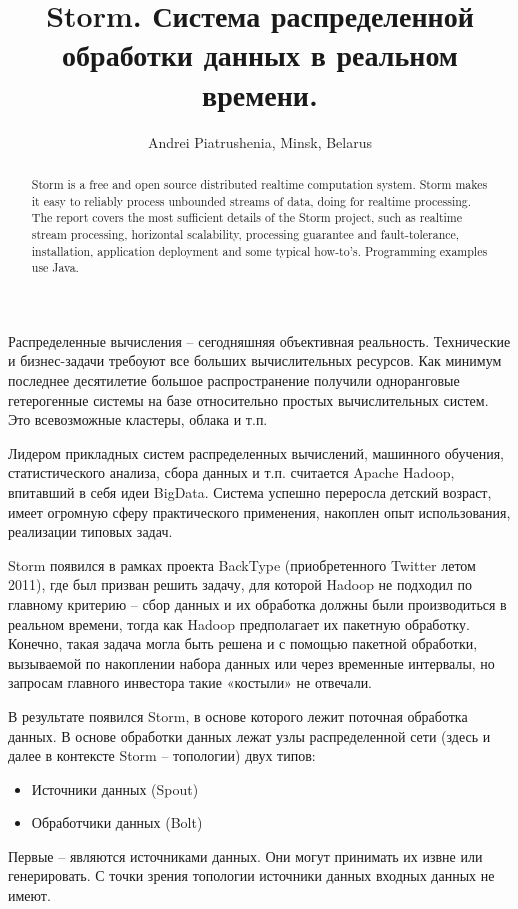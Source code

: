 \documentclass[10pt, a5paper]{article}
\begin{document}
\title{Storm. Система распределенной обработки данных в реальном времени.}
\author{Andrei Piatrushenia, Minsk, Belarus}
\maketitle
\begin{abstract}
Storm is a free and open source distributed realtime computation system. Storm makes it easy to reliably process unbounded streams of data, doing for realtime processing.
The report covers the most sufficient details of the Storm project, such as realtime stream processing, horizontal scalability, processing guarantee and fault-tolerance, installation, application deployment and some typical how-to's. 
Programming examples use Java.
\end{abstract}
Распределенные вычисления -- сегодняшняя объективная реальность. Технические и бизнес-задачи требоуют все больших вычислительных ресурсов. Как минимум последнее десятилетие большое распространение получили одноранговые гетерогенные системы на базе относительно простых вычислительных систем. Это всевозможные кластеры, облака и т.п.

Лидером прикладных систем распределенных вычислений, машинного обучения, статистического анализа, сбора данных и т.п. считается Apache Hadoop, впитавший в себя идеи BigData. Система успешно переросла детский возраст, имеет огромную сферу практического применения, накоплен опыт использования, реализации типовых задач.

Storm появился в рамках проекта BackType (приобретенного Twitter летом 2011), где был призван решить задачу, для которой Hadoop не подходил по главному критерию – сбор данных и их обработка должны были производиться в реальном времени, тогда как Hadoop предполагает их пакетную обработку. Конечно, такая задача могла быть решена и с помощью пакетной обработки, вызываемой по накоплении набора данных или через временные интервалы, но запросам главного инвестора такие «костыли» не отвечали.

В результате появился Storm, в основе которого лежит поточная обработка данных. 
В основе обработки данных лежат узлы распределенной сети (здесь и далее в контексте Storm – топологии) двух типов:
\begin{itemize}
\item Источники данных (Spout)
\item Обработчики данных (Bolt)
\end{itemize}

Первые – являются источниками данных. Они могут принимать их извне или генерировать. С точки зрения топологии источники данных входных данных не имеют.
\end{document}
